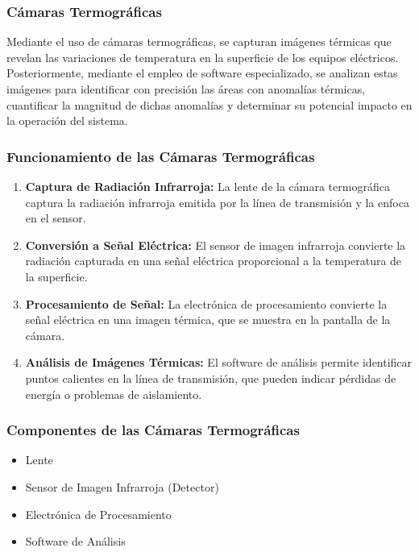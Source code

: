         \subsubsection{Cámaras Termográficas}

            Mediante el uso de cámaras termográficas, se capturan imágenes térmicas que revelan las variaciones de temperatura en la superficie de los equipos eléctricos. Posteriormente, mediante el empleo de software especializado, se analizan estas imágenes para identificar con precisión las áreas con anomalías térmicas, cuantificar la magnitud de dichas anomalías y determinar su potencial impacto en la operación del sistema. 

        \subsubsection*{Funcionamiento de las Cámaras Termográficas}

            \begin{enumerate}
                \item \textbf{Captura de Radiación Infrarroja:} La lente de la cámara termográfica captura la radiación infrarroja emitida por la línea de transmisión y la enfoca en el sensor.
                \item \textbf{Conversión a Señal Eléctrica:} El sensor de imagen infrarroja convierte la radiación capturada en una señal eléctrica proporcional a la temperatura de la superficie.
                \item \textbf{Procesamiento de Señal:} La electrónica de procesamiento convierte la señal eléctrica en una imagen térmica, que se muestra en la pantalla de la cámara.
                \item \textbf{Análisis de Imágenes Térmicas:} El software de análisis permite identificar puntos calientes en la línea de transmisión, que pueden indicar pérdidas de energía o problemas de aislamiento.
            \end{enumerate}

        \subsubsection*{Componentes de las Cámaras Termográficas}

            \begin{itemize}
              \item Lente
              \item Sensor de Imagen Infrarroja (Detector)
              \item Electrónica de Procesamiento
              \item Software de Análisis
            \end{itemize}

